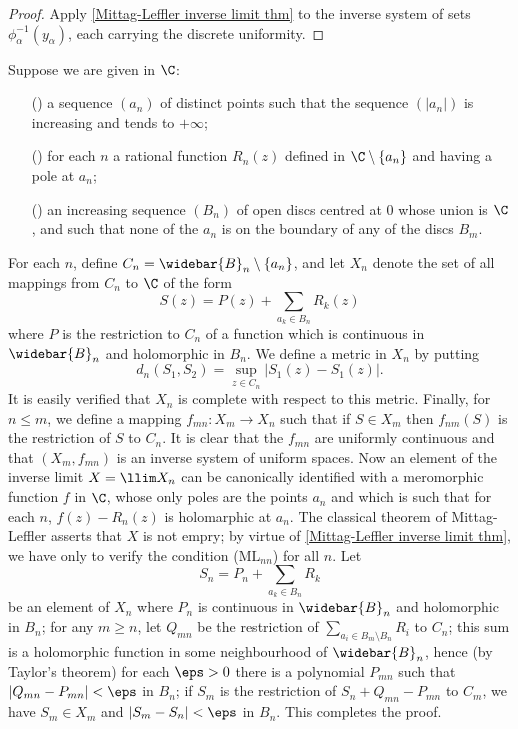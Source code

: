 \begin{proof}
Apply \cref{Mittag-Leffler inverse limit thm} to the inverse system of sets $\phi_\alpha^{-1}(y_\alpha)$, each carrying the discrete uniformity.
\end{proof}
\begin{example}
Suppose we are given in $\C$:
\begin{itemize}
\item[(\rmnum{1})] a sequence $(a_n)$ of distinct points such that the sequence $(|a_n|)$ is increasing and tends to $+\infty$;
\item[(\rmnum{2})] for each $n$ a rational function $R_n(z)$ defined in $\C\setminus\{a_n\}$ and having a pole at $a_n$;
\item[(\rmnum{3})] an increasing sequence $(B_n)$ of open discs centred at $0$ whose union is $\C$, and such that none of the $a_n$ is on the boundary of any of the discs $B_m$.
\end{itemize}
For each $n$, define $C_n=\widebar{B}_n\setminus\{a_n\}$, and let $X_n$ denote the set of all mappings from $C_n$ to $\C$ of the form
\[S(z)=P(z)+\sum_{a_k\in B_n}R_k(z)\]
where $P$ is the restriction to $C_n$ of a function which is continuous in $\widebar{B}_n$ and holomorphic in $B_n$. We define a metric in $X_n$ by putting
\[d_n(S_1,S_2)=\sup_{z\in C_n}|S_1(z)-S_1(z)|.\]
It is easily verified that $X_n$ is complete with respect to this metric. Finally, for $n\leq m$, we define a mapping $f_{mn}:X_m\to X_n$ such that if $S\in X_m$ then $f_{nm}(S)$ is the restriction of $S$ to $C_n$. It is clear that the $f_{mn}$ are uniformly continuous and that $(X_m,f_{mn})$ is an inverse system of uniform spaces. Now an element of the inverse limit $X=\llim X_n$ can be canonically identified with a meromorphic function $f$ in $\C$, whose only poles are the points $a_n$ and which is such that for each $n$, $f(z)-R_n(z)$ is holomarphic at $a_n$. The classical theorem of Mittag-Leffler asserts that $X$ is not empry; by virtue of \cref{Mittag-Leffler inverse limit thm}, we have only to verify the condition ($\text{ML}_{nn}$) for all $n$. Let
\[S_n=P_n+\sum_{a_k\in B_n}R_k\]
be an element of $X_n$ where $P_n$ is continuous in $\widebar{B}_n$ and holomorphic in $B_n$; for any $m\geq n$, let $Q_{mn}$ be the restriction of
$\sum_{a_i\in B_m\setminus B_n}R_i$ to $C_n$; this sum is a holomorphic function in some neighbourhood of $\widebar{B}_n$, hence (by Taylor's theorem) for each $\eps>0$ there is a polynomial $P_{mn}$ such that $|Q_{mn}-P_{mn}|<\eps$ in $B_n$; if $S_m$ is the restriction of $S_n+Q_{mn}-P_{mn}$ to $C_m$, we have $S_m\in X_m$ and $|S_m-S_n|<\eps$ in $B_n$. This completes the proof.
\end{example}
